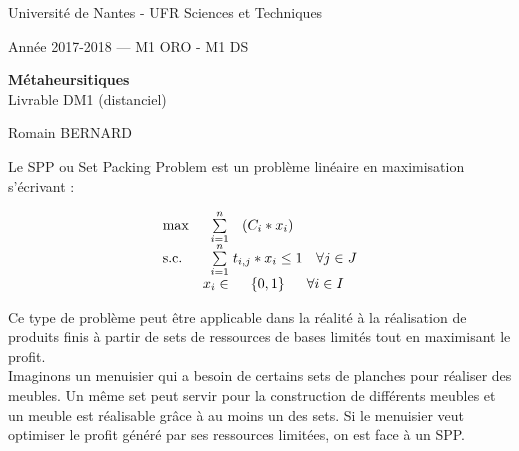 \documentclass[ a4paper,10pt]{article}
\begin{document}
{\large
\begin{center}
Université de Nantes - UFR Sciences et Techniques

Année 2017-2018    ---   M1 ORO - M1 DS
\vspace{5mm}
 
{ \Large \textbf {Métaheursitiques }\\ Livrable DM1 (distanciel)\medskip
 
  Romain \textsc{BERNARD}
}  
\end{center}
}

\noindent

%
%

\vspace{5mm}
\noindent
{}
\vspace{2mm}

\noindent
Le SPP ou Set Packing Problem est un problème linéaire en maximisation s'écrivant  :

\begin{equation*}
\setlength\arraycolsep{1.5pt}
  \begin{array}{l@{\quad} r c r c r}
    \max          & \sum_{i=1}^{n} \limits & (C_i * x_i)    \\
    \mathrm{s.c.} & \sum_{i=1}^{n} \limits & t_{i,j} * x_{i} \leq  1 & \forall j \in & J \\
    			  & x_i \in & \{0,1\} & \forall i \in I
  \end{array}
\end{equation*}

Ce type de problème peut être applicable dans la réalité à la réalisation de produits finis à partir de sets de ressources de bases limités tout en maximisant le profit. \\ Imaginons un menuisier qui a besoin de certains sets de planches pour réaliser des meubles. Un même set peut servir pour la construction de différents meubles et un meuble est réalisable grâce à au moins un des sets. Si le menuisier veut optimiser le profit généré par ses ressources limitées, on est face à un SPP.
\end{document}
